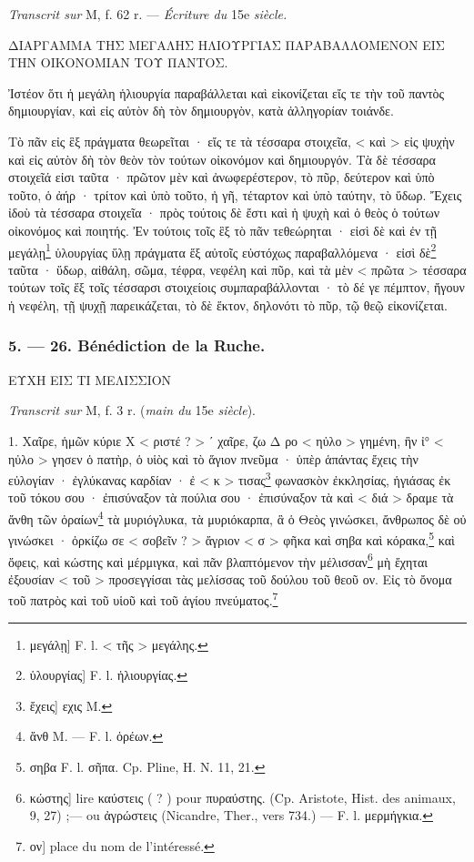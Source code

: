 \documentclass[a4paper, 11pt, oneside, polutonikogreek, french]{article}
\begin{document}
\emph{Transcrit sur} M, f. 62 r. --- \emph{Écriture du} 15e \emph{siècle.}

ΔΙΑΡΓΑΜΜΑ ΤΗΣ ΜΕΓΑΛΗΣ ΗΛΙΟΥΡΓΙΑΣ ΠΑΡΑΒΑΛΛΟΜΕΝΟΝ ΕΙΣ ΤΗΝ ΟΙΚΟΝΟΜΙΑΝ ΤΟΥ ΠΑΝΤΟΣ.

Ἰστέον ὅτι ἡ μεγάλη ἡλιουργία παραβάλλεται καὶ εἰκονίζεται εἴς τε τὴν τοῦ παντὸς δημιουργίαν, καὶ εἰς αὐτὸν δὴ τὸν δημιουργὸν, κατὰ ἀλληγορίαν τοιάνδε.

Τὸ πᾶν εἰς ἓξ πράγματα θεωρεῖται · εἴς τε τὰ τέσσαρα στοιχεῖα, < καὶ > εἰς ψυχὴν καὶ εἰς αὐτὸν δὴ τὸν θεὸν τὸν τούτων οἰκονόμον καὶ δημιουργόν. Τὰ δὲ τέσσαρα στοιχεῖά εἰσι ταῦτα · πρῶτον μὲν καὶ ἀνωφερέστερον, τὸ πῦρ, δεύτερον καὶ ὑπὸ τοῦτο, ὁ ἀήρ · τρίτον καὶ ὑπὸ τοῦτο, ἠ γῆ, τέταρτον καὶ ὑπὸ ταύτην, τὸ ὕδωρ. Ἔχεις ἰδοὺ τὰ τέσσαρα στοιχεῖα · πρὸς τούτοις δὲ ἔστι καὶ ἡ ψυχὴ καὶ ὁ θεὸς ὁ τούτων οἰκονόμος καὶ ποιητής. Ἐν τούτοις τοῖς ἓξ τὸ πᾶν τεθεώρηται · εἰσὶ δὲ καὶ ἐν τῇ μεγάλῃ\footnote{μεγάλῃ] F. l. < τῆς > μεγάλης.} ὑλουργίας ὕλῃ πράγματα ἕξ αὐτοῖς εὐστόχως παραβαλλόμενα · εἰσὶ δὲ\footnote{ὑλουργίας] F. l. ἡλιουργίας.} ταῦτα · ὕδωρ, αἰθάλη, σῶμα, τέφρα, νεφέλη καὶ πῦρ, καὶ τὰ μὲν < πρῶτα > τέσσαρα τούτων τοῖς ἕξ τοῖς τέσσαρσι στοιχείοις συμπαραβάλλονται · τὸ δέ γε πέμπτον, ἤγουν ἡ νεφέλη, τῇ ψυχῇ παρεικάζεται, τὸ δὲ ἕκτον, δηλονότι τὸ πῦρ, τῷ θεῷ εἰκονίζεται.

\bigskip
\centerline{\EightStarTaper}
\centerline{\EightStarTaper\EightStarTaper}
\bigskip

\subsubsection{5. --- 26. Bénédiction de la Ruche.}

ΕΥΧΗ ΕΙΣ ΤΙ ΜΕΛΙΣΣΙΟΝ

\emph{Transcrit sur} M, f. 3 r. (\emph{main du} 15e \emph{siècle}).

1. Χαῖρε, ἡμῶν κύριε Χ < ριστέ ? > ʹ χαῖρε, ζω     Δ ρο < ηὐλο > γημένη, ἣν ἰ° < ηὐλο > γησεν ὁ πατὴρ, ὁ υἱὸς καὶ τὸ ἅγιον πνεῦμα · ὑπὲρ ἁπάντας ἔχεις τὴν εὐλογίαν · ἐγλύκανας καρδίαν · ἐ < κ > τισας\footnote{ἔχεις] εχις M.} φωνασκὸν ἐκκλησίας, ἡγιάσας ἐκ τοῦ τόκου σου · ἐπισύναξον τὰ πούλια σου · ἐπισύναξον τὰ      καὶ < διά > δραμε τὰ ἄνθη τῶν ὀραίων\footnote{ἄνθ M. --- F. l. ὀρέων.} τὰ μυριόγλυκα, τὰ μυριόκαρπα, ἃ ὁ Θεὸς γινώσκει, ἄνθρωπος δὲ οὐ γινώσκει · ὀρκίζω σε < σοβεῖν ? > ἄγριον < σ > φῆκα καὶ σηβα καὶ κόρακα,\footnote{σηβα F. l. σῆπα. Cp. Pline, H. N. 11, 21.} καὶ ὄφεις, καὶ κώστης καὶ μέρμιγκα, καὶ πᾶν βλαπτόμενον τὴν μέλισσαν\footnote{κώστης] lire καύστεις ( ? ) pour πυραύστης. (Cp. Aristote, Hist. des animaux, 9, 27) ;--- ou ἀγρώστεις (Nicandre, Ther., vers 734.) --- F. l. μερμήγκια.} μὴ ἔχηται ἐξουσίαν < τοῦ > προσεγγίσαι τὰς μελίσσας τοῦ δούλου τοῦ θεοῦ ον. Εἰς τὸ ὄνομα τοῦ πατρὸς καὶ τοῦ υἱοῦ καὶ τοῦ ἁγίου πνεύματος.\footnote{ον] place du nom de l'intéressé.}
\end{document}
